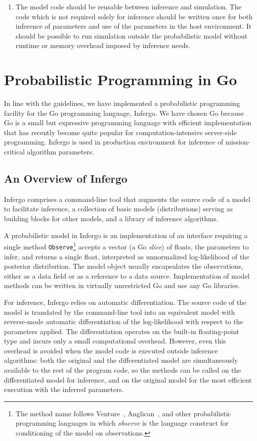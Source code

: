 \documentclass[sigplan,review,10pt,anonymous]{acmart}
\begin{document}
\begin{sloppypar}
\begin{enumerate}
\item The model code should be reusable between inference and
simulation. The code which is not required solely for inference
should be written once for both inference of parameters and use
of the parameters in the host environment.  It should be
possible to run simulation outside the probabilistic model without
runtime or memory overhead imposed by inference needs.
\end{enumerate}

\section{Probabilistic Programming in Go}

In line with the guidelines, we have implemented a probabilistic
programming facility for the Go programming language, Infergo.
We have chosen Go because Go is a
small but expressive programming language with efficient
implementation that has recently become quite popular for
computation-intensive server-side programming. Infergo is used
in production environment for inference of mission-critical
algorithm parameters.

\subsection{An Overview of Infergo}

Infergo comprises a command-line tool that augments the source
code of a model to facilitate inference, a collection of basic
models (distributions) serving as building blocks for other
models, and a library of inference algorithms.

A probabilistic model in Infergo is an implementation of an
interface requiring a single method
\lstinline{Observe}\footnote{The method name follows
Venture~\cite{MSP14}, Anglican~\cite{TMY+16}, and other
probabilistic programming languages in which \textit{observe} is
the language construct for conditioning of the model on
observations.} accepts a vector (a Go \textit{slice}) of floats,
the parameters to infer, and returns a single float, interpreted
as unnormalized log-likelihood of the posterior distribution.
The model object usually encapsulates the observations, either
as a data field or as a reference to a data source.
Implementation of model methods can be written in virtually
unrestricted Go and use any Go libraries.

For inference, Infergo relies on automatic differentiation. The
source code of the model is translated by the command-line tool
into an equivalent model with reverse-mode automatic
differentiation of the log-likelihood with respect to the
parameters applied. The differentiation operates on the built-in
floating-point type and incurs only a small computational
overhead. However, even this overhead is avoided when the model
code is executed outside inference algorithms: both the original
and the differentiated model are simultaneously available to the
rest of the program code, so the methods can be called on the
differentiated model for inference, and on the original model
for the most efficient execution with the inferred parameters.


\end{sloppypar}
\end{document}
